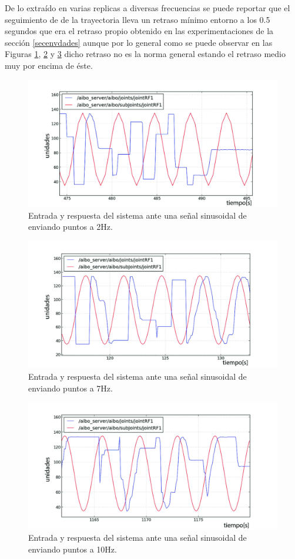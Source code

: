 \documentclass[12pt,a4paper,final,twoside]{book}
\begin{document}
De lo extraído en varias replicas a diversas frecuencias se puede reportar que el seguimiento de de la trayectoria lleva un retraso mínimo entorno a los 0.5 segundos que era el retraso propio obtenido en las experimentaciones de la sección \ref{secenvdades} aunque por lo general como se puede observar en las Figuras \ref{fig:ASsin2Hz}, \ref{fig:ASsin7Hz} y \ref{fig:ASsin10Hz} 
dicho retraso no es la norma general estando el retraso medio muy por encima de éste.
\begin{figure}[H]
	\centering
	    \includegraphics[scale=0.21]{images/10Ry2S.jpg}
 	\caption{Entrada y respuesta del sistema ante una señal sinusoidal de enviando puntos a 2Hz.}
  \label{fig:ASsin2Hz}
\end{figure}
\begin{figure}[H]
	\centering
    \includegraphics[scale=0.21]{images/10Ry7S.jpg}
 	\caption{Entrada y respuesta del sistema ante una señal sinusoidal de enviando puntos a 7Hz.}
  \label{fig:ASsin7Hz}
\end{figure}
   \begin{figure}[H]
	\centering
    \includegraphics[scale=0.21]{images/10Ry10SAll.jpg}
 	\caption{Entrada y respuesta del sistema ante una señal sinusoidal de enviando puntos a 10Hz.}
  \label{fig:ASsin10Hz}
\end{figure}
\end{document}
